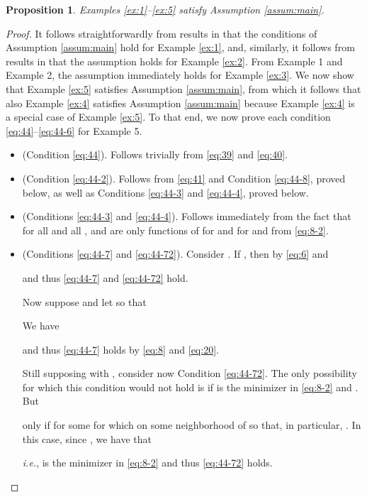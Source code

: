 \documentclass[letterpaper, 10 pt, conference]{ieeeconf}
\newtheorem{prop}{Proposition}
\begin{document}
\begin{prop}
\label{sec:examples-1}
  Examples \ref{ex:1}--\ref{ex:5} satisfy Assumption \ref{assum:main}.
\end{prop}
\begin{proof}

It follows straightforwardly from results in \cite{Lovisari:2014qv} that the conditions of Assumption \ref{assum:main} hold for Example \ref{ex:1}, and, similarly, it follows from results in \cite{Coogan:2015mz} that the assumption holds for Example \ref{ex:2}. From Example 1 and Example 2, the assumption immediately holds for Example \ref{ex:3}. We now show that Example \ref{ex:5} satisfies Assumption \ref{assum:main}, from which it follows that also Example \ref{ex:4} satisfies Assumption \ref{assum:main} because Example \ref{ex:4} is a special case of Example \ref{ex:5}. To that end, we now prove each condition \ref{eq:44}--\ref{eq:44-6} for Example 5.



\begin{itemize}[leftmargin=*]
\item    (Condition \ref{eq:44}).  Follows trivially from \eqref{eq:39} and \eqref{eq:40}.
    \item    (Condition \ref{eq:44-2}). Follows from \eqref{eq:41} and Condition \ref{eq:44-8}, proved below, as well as Conditions \ref{eq:44-3} and \ref{eq:44-4}, proved below.
    \item    (Conditions \ref{eq:44-3} and \ref{eq:44-4}). Follows immediately from the fact that for all  and all ,  and  are only functions of  for  and  for  and from \eqref{eq:8-2}.
 \item    (Conditions \ref{eq:44-7} and \ref{eq:44-72}). 
Consider . If , then  by \eqref{eq:6} and

and thus \ref{eq:44-7} and \ref{eq:44-72} hold. 

Now suppose  and let  so that

We have 

and thus \ref{eq:44-7} holds by \eqref{eq:8} and \eqref{eq:20}.

Still supposing  with , consider now Condition \ref{eq:44-72}. The only possibility for which this condition would not hold is if  is the minimizer in \eqref{eq:8-2} and . But

only if  for some  for which  on some neighborhood of  so that, in particular, . In this case, since , we have that

\emph{i.e.},  is the minimizer in \eqref{eq:8-2} and thus \ref{eq:44-72} holds.


\end{itemize}
\end{proof}
\end{document}
